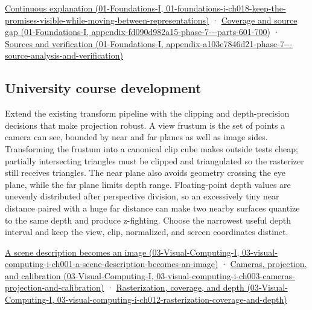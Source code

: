 \href{../01-Foundations-I/main.pdf\#nameddest=01-foundations-i-ch018-keep-the-promises-visible-while-moving-between-representations}{Continuous explanation (01-Foundations-I, 01-foundations-i-ch018-keep-the-promises-visible-while-moving-between-representations)} · \href{../01-Foundations-I/main.pdf\#nameddest=appendix-fd090d982a15-phase-7---parts-601-700}{Coverage and source gap (01-Foundations-I, appendix-fd090d982a15-phase-7-\/-\/-parts-601-700)} · \href{../01-Foundations-I/main.pdf\#nameddest=appendix-a103e7846d21-phase-7---source-analysis-and-verification}{Sources and verification (01-Foundations-I, appendix-a103e7846d21-phase-7-\/-\/-source-analysis-and-verification)}

\subsection{University course development}\label{appendix-1c07d64f5e70-university-course-development}

Extend the existing transform pipeline with the clipping and depth-precision decisions that make projection robust. A view frustum is the set of points a camera can see, bounded by near and far planes as well as image sides. Transforming the frustum into a canonical clip cube makes outside tests cheap; partially intersecting triangles must be clipped and triangulated so the rasterizer still receives triangles. The near plane also avoids geometry crossing the eye plane, while the far plane limits depth range. Floating-point depth values are unevenly distributed after perspective division, so an excessively tiny near distance paired with a huge far distance can make two nearby surfaces quantize to the same depth and produce z-fighting. Choose the narrowest useful depth interval and keep the view, clip, normalized, and screen coordinates distinct.

\href{../03-Visual-Computing-I/main.pdf\#nameddest=03-visual-computing-i-ch001-a-scene-description-becomes-an-image}{A scene description becomes an image (03-Visual-Computing-I, 03-visual-computing-i-ch001-a-scene-description-becomes-an-image)} · \href{../03-Visual-Computing-I/main.pdf\#nameddest=03-visual-computing-i-ch003-cameras-projection-and-calibration}{Cameras, projection, and calibration (03-Visual-Computing-I, 03-visual-computing-i-ch003-cameras-projection-and-calibration)} · \href{../03-Visual-Computing-I/main.pdf\#nameddest=03-visual-computing-i-ch012-rasterization-coverage-and-depth}{Rasterization, coverage, and depth (03-Visual-Computing-I, 03-visual-computing-i-ch012-rasterization-coverage-and-depth)}

